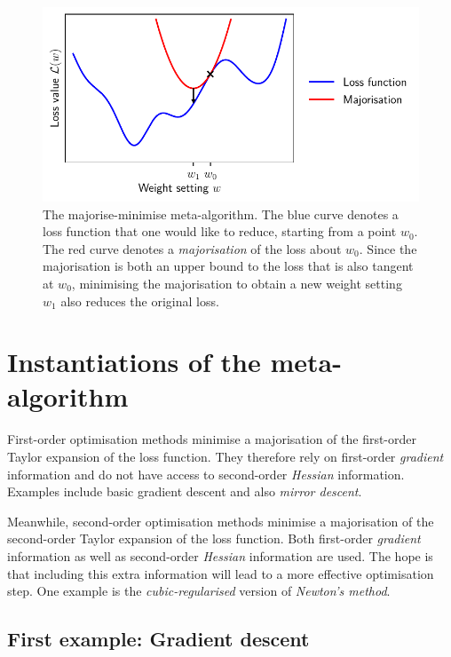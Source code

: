 \begin{refsection}
\begin{figure}
    \centering
    \includegraphics{figures/maj-min.pdf}
    \caption[The majorise-minimise meta-algorithm]{The majorise-minimise meta-algorithm. The blue curve denotes a loss function that one would like to reduce, starting from a point $w_0$. The red curve denotes a \textit{majorisation} of the loss about $w_0$. Since the majorisation is both an upper bound to the loss that is also tangent at $w_0$, minimising the majorisation to obtain a new weight setting $w_1$ also reduces the original loss.}
    \label{fig:major-minor}
\end{figure}

\section{Instantiations of the meta-algorithm}
\label{sec:examples}

First-order optimisation methods minimise a majorisation of the first-order Taylor expansion of the loss function. They therefore rely on first-order \textit{gradient} information and do not have access to second-order \textit{Hessian} information. Examples include basic gradient descent and also \textit{mirror descent}.

Meanwhile, second-order optimisation methods minimise a majorisation of the second-order Taylor expansion of the loss function. Both first-order \textit{gradient} information as well as second-order \textit{Hessian} information are used. The hope is that including this extra information will lead to a more effective optimisation step. One example is the \textit{cubic-regularised} version of \textit{Newton's method}.

\subsection{First example: Gradient descent}


\end{refsection}
